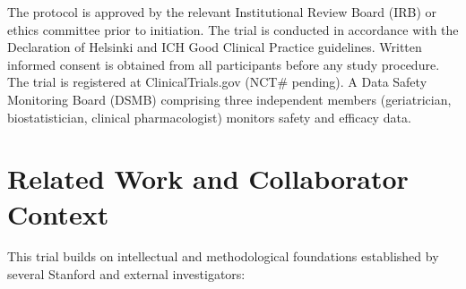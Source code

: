 \documentclass[11pt,a4paper]{article}
\begin{document}
The protocol is approved by the relevant Institutional Review Board (IRB) or ethics committee prior to initiation. The trial is conducted in accordance with the Declaration of Helsinki and ICH Good Clinical Practice guidelines. Written informed consent is obtained from all participants before any study procedure. The trial is registered at ClinicalTrials.gov (NCT\# pending). A Data Safety Monitoring Board (DSMB) comprising three independent members (geriatrician, biostatistician, clinical pharmacologist) monitors safety and efficacy data.

\section{Related Work and Collaborator Context}

This trial builds on intellectual and methodological foundations established by several Stanford and external investigators:
\end{document}
